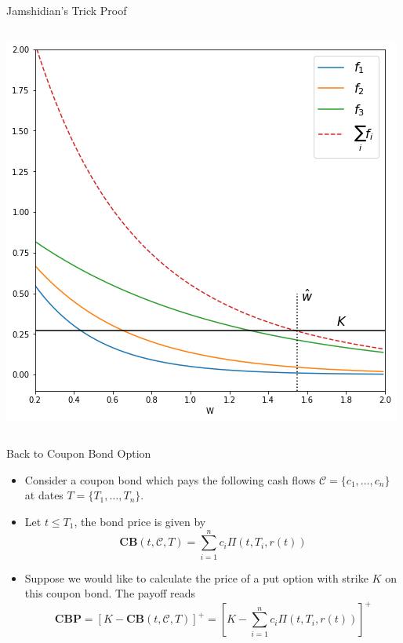 \documentclass{beamer}
\begin{document}
\begin{frame}{Jamshidian's Trick Proof}
\begin{itemize}
\begin{columns}
	\includegraphics[width=1\linewidth]{jamshidian_trick}
	\end{columns}
\end{itemize}
\end{frame}

\begin{frame}{Back to Coupon Bond Option}
\begin{itemize}
	\item Consider a coupon bond which pays the following cash flows $\mathcal{C}=\{c_1,\dots,c_n\}$ at dates $T=\{T_1,\ldots,T_n\}$.
	\item Let $t\leq T_1$, the bond price is given by
	\begin{equation*}
		\textbf{CB}(t,\mathcal{C},T)=\sum_{i=1}^n c_i \Pi(t, T_i, r(t))
	\end{equation*}
	\item Suppose we would like to calculate the price of a put option with strike $K$ on this coupon bond. The payoff reads
	\begin{equation*}
		\textbf{CBP}=\left[K-\textbf{CB}(t,\mathcal{C},T)\right]^+ = \left[K-\sum_{i=1}^n c_i \Pi(t, T_i, r(t))\right]^+
	\end{equation*}
\end{itemize}
\end{frame}
\end{document}
